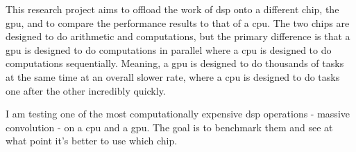 This research project aims to offload the work of \gls{dsp} onto a different chip, the \gls{gpu}, and to compare the performance results to that of a \gls{cpu}. The two chips are designed to do arithmetic and computations, but the primary difference is that a \gls{gpu} is designed to do computations in parallel where a \gls{cpu} is designed to do computations sequentially. Meaning, a \gls{gpu} is designed to do thousands of tasks at the same time at an overall slower rate, where a \gls{cpu} is designed to do tasks one after the other incredibly quickly.

I am testing one of the most computationally expensive \gls{dsp} operations - massive convolution - on a \gls{cpu} and a \gls{gpu}. The goal is to benchmark them and see at what point it's better to use which chip.